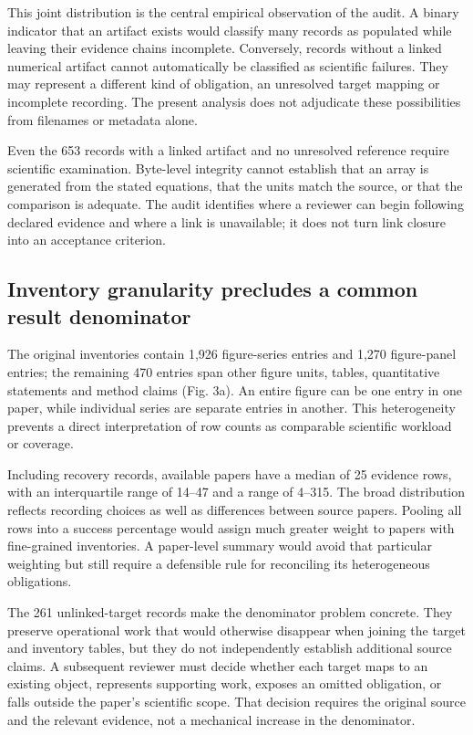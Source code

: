 \documentclass[10pt,a4paper]{article}
\begin{document}
This joint distribution is the central empirical observation of the
audit. A binary indicator that an artifact exists would classify many
records as populated while leaving their evidence chains incomplete.
Conversely, records without a linked numerical artifact cannot
automatically be classified as scientific failures. They may represent a
different kind of obligation, an unresolved target mapping or incomplete
recording. The present analysis does not adjudicate these possibilities
from filenames or metadata alone.

Even the 653 records with a linked artifact and no unresolved reference
require scientific examination. Byte-level integrity cannot establish
that an array is generated from the stated equations, that the units
match the source, or that the comparison is adequate. The audit
identifies where a reviewer can begin following declared evidence and
where a link is unavailable; it does not turn link closure into an
acceptance criterion.

\subsection{Inventory granularity precludes a common result
denominator}\label{inventory-granularity-precludes-a-common-result-denominator}

The original inventories contain 1,926 figure-series entries and 1,270
figure-panel entries; the remaining 470 entries span other figure units,
tables, quantitative statements and method claims (Fig. 3a). An entire
figure can be one entry in one paper, while individual series are
separate entries in another. This heterogeneity prevents a direct
interpretation of row counts as comparable scientific workload or
coverage.

Including recovery records, available papers have a median of 25
evidence rows, with an interquartile range of 14--47 and a range of
4--315. The broad distribution reflects recording choices as well as
differences between source papers. Pooling all rows into a success
percentage would assign much greater weight to papers with fine-grained
inventories. A paper-level summary would avoid that particular weighting
but still require a defensible rule for reconciling its heterogeneous
obligations.

The 261 unlinked-target records make the denominator problem concrete.
They preserve operational work that would otherwise disappear when
joining the target and inventory tables, but they do not independently
establish additional source claims. A subsequent reviewer must decide
whether each target maps to an existing object, represents supporting
work, exposes an omitted obligation, or falls outside the paper's
scientific scope. That decision requires the original source and the
relevant evidence, not a mechanical increase in the denominator.
\end{document}
